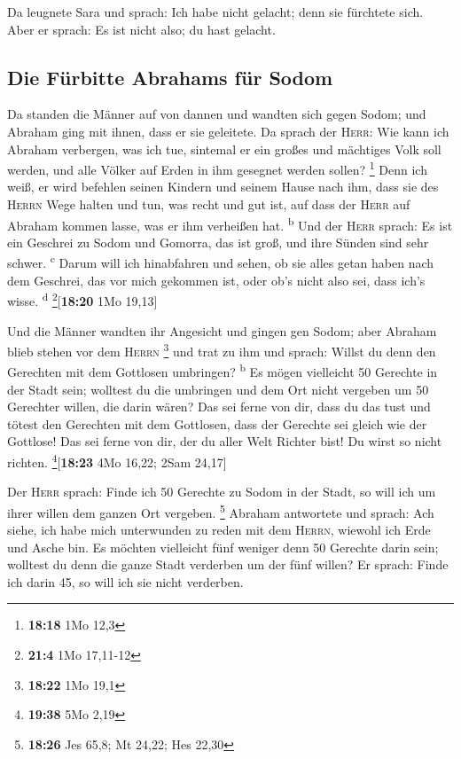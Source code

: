  Da leugnete Sara und sprach: Ich habe nicht gelacht;
denn sie fürchtete sich. Aber er sprach: Es ist nicht also; du hast
gelacht.

\hypertarget{die-fuxfcrbitte-abrahams-fuxfcr-sodom}{%
\subsection{Die Fürbitte Abrahams für
Sodom}\label{die-fuxfcrbitte-abrahams-fuxfcr-sodom}}

 Da standen die Männer auf von dannen und wandten sich
gegen Sodom; und Abraham ging mit ihnen, dass er sie geleitete.
 Da sprach der \textsc{Herr}: Wie kann ich Abraham
verbergen, was ich tue,  sintemal er ein großes und
mächtiges Volk soll werden, und alle Völker auf Erden in ihm gesegnet
werden sollen? \footnote{\textbf{18:18} 1Mo 12,3}  Denn
ich weiß, er wird befehlen seinen Kindern und seinem Hause nach ihm,
dass sie des \textsc{Herrn} Wege halten und tun, was recht und gut ist,
auf dass der \textsc{Herr} auf Abraham kommen lasse, was er ihm
verheißen hat. \textsuperscript{b}  Und der \textsc{Herr}
sprach: Es ist ein Geschrei zu Sodom und Gomorra, das ist groß, und ihre
Sünden sind sehr schwer. \textsuperscript{c}  Darum will
ich hinabfahren und sehen, ob sie alles getan haben nach dem Geschrei,
das vor mich gekommen ist, oder ob's nicht also sei, dass ich's wisse.
\textsuperscript{d} \footnote{\textbf{21:4} 1Mo 17,11-12}{[}\textbf{18:20}
1Mo 19,13{]}

 Und die Männer wandten ihr Angesicht und gingen gen
Sodom; aber Abraham blieb stehen vor dem \textsc{Herrn} \footnote{\textbf{18:22}
  1Mo 19,1}  und trat zu ihm und sprach: Willst du denn
den Gerechten mit dem Gottlosen umbringen? \textsuperscript{b}
 Es mögen vielleicht 50 Gerechte in der Stadt sein;
wolltest du die umbringen und dem Ort nicht vergeben um 50 Gerechter
willen, die darin wären?  Das sei ferne von dir, dass du
das tust und tötest den Gerechten mit dem Gottlosen, dass der Gerechte
sei gleich wie der Gottlose! Das sei ferne von dir, der du aller Welt
Richter bist! Du wirst so nicht richten. \footnote{\textbf{19:38} 5Mo
  2,19}{[}\textbf{18:23} 4Mo 16,22; 2Sam 24,17{]}

 Der \textsc{Herr} sprach: Finde ich 50 Gerechte zu Sodom
in der Stadt, so will ich um ihrer willen dem ganzen Ort vergeben.
\footnote{\textbf{18:26} Jes 65,8; Mt 24,22; Hes 22,30} 
Abraham antwortete und sprach: Ach siehe, ich habe mich unterwunden zu
reden mit dem \textsc{Herrn}, wiewohl ich Erde und Asche bin.
 Es möchten vielleicht fünf weniger denn 50 Gerechte
darin sein; wolltest du denn die ganze Stadt verderben um der fünf
willen? Er sprach: Finde ich darin 45, so will ich sie nicht verderben.

